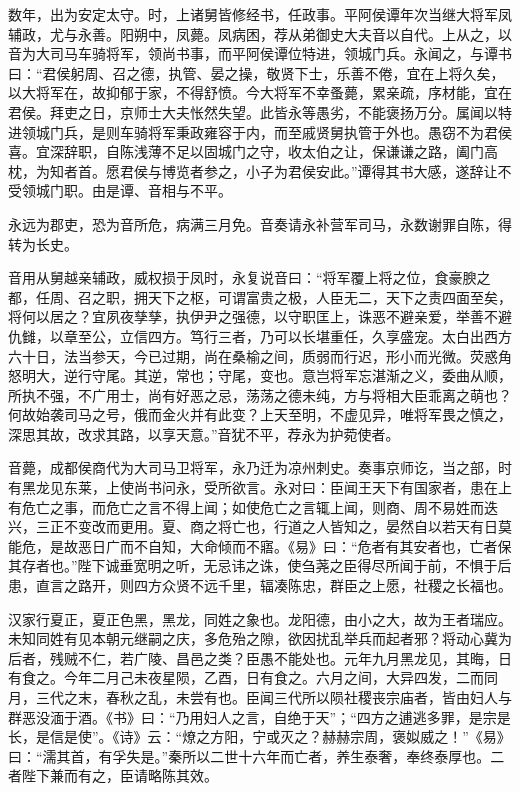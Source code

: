 \documentclass[12pt,UTF8]{ctexbook}
\begin{document}
数年，出为安定太守。时，上诸舅皆修经书，任政事。平阿侯谭年次当继大将军凤辅政，尤与永善。阳朔中，凤薨。凤病困，荐从弟御史大夫音以自代。上从之，以音为大司马车骑将军，领尚书事，而平阿侯谭位特进，领城门兵。永闻之，与谭书曰：“君侯躬周、召之德，执管、晏之操，敬贤下士，乐善不倦，宜在上将久矣，以大将军在，故抑郁于家，不得舒愤。今大将军不幸蚤薨，累亲疏，序材能，宜在君侯。拜吏之日，京师士大夫怅然失望。此皆永等愚劣，不能褒扬万分。属闻以特进领城门兵，是则车骑将军秉政雍容于内，而至戚贤舅执管于外也。愚窃不为君侯喜。宜深辞职，自陈浅薄不足以固城门之守，收太伯之让，保谦谦之路，阖门高枕，为知者首。愿君侯与博览者参之，小子为君侯安此。”谭得其书大感，遂辞让不受领城门职。由是谭、音相与不平。



永远为郡吏，恐为音所危，病满三月免。音奏请永补营军司马，永数谢罪自陈，得转为长史。



音用从舅越亲辅政，威权损于凤时，永复说音曰：“将军覆上将之位，食豪腴之都，任周、召之职，拥天下之枢，可谓富贵之极，人臣无二，天下之责四面至矣，将何以居之？宜夙夜孳孳，执伊尹之强德，以守职匡上，诛恶不避亲爱，举善不避仇雠，以章至公，立信四方。笃行三者，乃可以长堪重任，久享盛宠。太白出西方六十日，法当参天，今已过期，尚在桑榆之间，质弱而行迟，形小而光微。荧惑角怒明大，逆行守尾。其逆，常也；守尾，变也。意岂将军忘湛渐之义，委曲从顺，所执不强，不广用士，尚有好恶之忌，荡荡之德未纯，方与将相大臣乖离之萌也？何故始袭司马之号，俄而金火并有此变？上天至明，不虚见异，唯将军畏之慎之，深思其故，改求其路，以享天意。”音犹不平，荐永为护菀使者。



音薨，成都侯商代为大司马卫将军，永乃迁为凉州刺史。奏事京师讫，当之部，时有黑龙见东莱，上使尚书问永，受所欲言。永对曰：臣闻王天下有国家者，患在上有危亡之事，而危亡之言不得上闻；如使危亡之言辄上闻，则商、周不易姓而迭兴，三正不变改而更用。夏、商之将亡也，行道之人皆知之，晏然自以若天有日莫能危，是故恶日广而不自知，大命倾而不寤。《易》曰：“危者有其安者也，亡者保其存者也。”陛下诚垂宽明之听，无忌讳之诛，使刍荛之臣得尽所闻于前，不惧于后患，直言之路开，则四方众贤不远千里，辐凑陈忠，群臣之上愿，社稷之长福也。



汉家行夏正，夏正色黑，黑龙，同姓之象也。龙阳德，由小之大，故为王者瑞应。未知同姓有见本朝元继嗣之庆，多危殆之隙，欲因扰乱举兵而起者邪？将动心冀为后者，残贼不仁，若广陵、昌邑之类？臣愚不能处也。元年九月黑龙见，其晦，日有食之。今年二月己未夜星陨，乙酉，日有食之。六月之间，大异四发，二而同月，三代之末，春秋之乱，未尝有也。臣闻三代所以陨社稷丧宗庙者，皆由妇人与群恶没湎于酒。《书》曰：“乃用妇人之言，自绝于天”；“四方之逋逃多罪，是宗是长，是信是使”。《诗》云：“燎之方阳，宁或灭之？赫赫宗周，褒姒威之！”《易》曰：“濡其首，有孚失是。”秦所以二世十六年而亡者，养生泰奢，奉终泰厚也。二者陛下兼而有之，臣请略陈其效。
\end{document}
